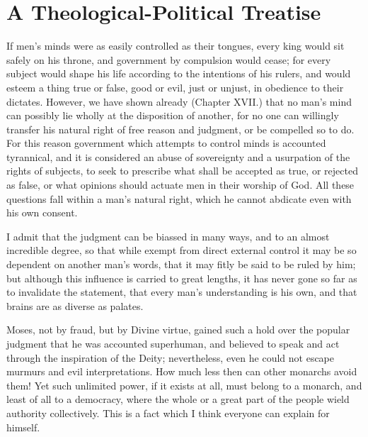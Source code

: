
\author{Benedict de Spinoza}
\chapter[A Theological-Political Treatise, chap. 20]{A
Theological-Political Treatise}


If men's minds were as easily controlled as their tongues,
every king would sit safely on his throne, and government by
compulsion would cease; for every subject would shape his life
according to the intentions of his rulers, and would esteem a thing
true or false, good or evil, just or unjust, in obedience to their
dictates. However, we have shown already (Chapter XVII.) that no man's
mind can possibly lie wholly at the disposition of another, for no one
can willingly transfer his natural right of free reason and judgment,
or be compelled so to do. For this reason government which attempts to
control minds is accounted tyrannical, and it is considered an abuse
of sovereignty and a usurpation of the rights of subjects, to seek to
prescribe what shall be accepted as true, or rejected as false, or
what opinions should actuate men in their worship of God. All these
questions fall within a man's natural right, which he cannot abdicate
even with his own consent.

I admit that the judgment can be biassed in many ways, and to an
almost incredible degree, so that while exempt from direct external
control it may be so dependent on another man's words, that it may
fitly be said to be ruled by him; but although this influence is
carried to great lengths, it has never gone so far as to invalidate
the statement, that every man's understanding is his own, and that
brains are as diverse as palates.

Moses, not by fraud, but by Divine virtue, gained such a hold over the
popular judgment that he was accounted superhuman, and believed to
speak and act through the inspiration of the Deity; nevertheless, even
he could not escape murmurs and evil interpretations. How much less
then can other monarchs avoid them! Yet such unlimited power, if it
exists at all, must belong to a monarch, and  least of all
to a democracy, where the whole or a great part of the people wield
authority collectively. This is a fact which I think everyone can
explain for himself.

